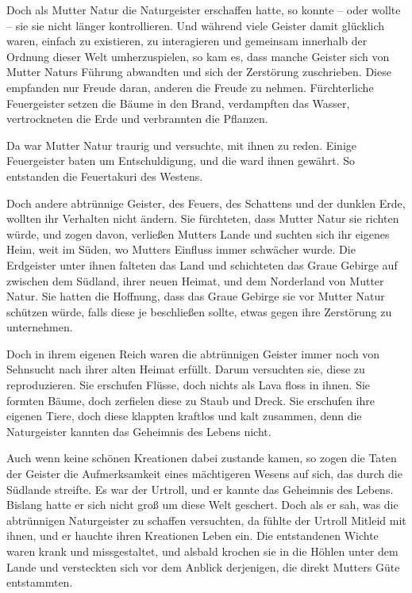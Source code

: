 Doch als Mutter Natur die Naturgeister erschaffen hatte, so konnte – oder wollte – sie sie nicht länger kontrollieren. Und während viele Geister damit glücklich waren, einfach zu existieren, zu interagieren und gemeinsam innerhalb der Ordnung dieser Welt umherzuspielen, so kam es, dass manche Geister sich von Mutter Naturs Führung abwandten und sich der Zerstörung zuschrieben. Diese empfanden nur Freude daran, anderen die Freude zu nehmen. Fürchterliche Feuergeister setzen die Bäume in den Brand, verdampften das Wasser, vertrockneten die Erde und verbrannten die Pflanzen.

Da war Mutter Natur traurig und versuchte, mit ihnen zu reden. Einige Feuergeister baten um Entschuldigung, und die ward ihnen gewährt. So entstanden die Feuertakuri des Westens.

Doch andere abtrünnige Geister, des Feuers, des Schattens und der dunklen Erde, wollten ihr Verhalten nicht ändern. Sie fürchteten, dass Mutter Natur sie richten würde, und zogen davon, verließen Mutters Lande und suchten sich ihr eigenes Heim, weit im Süden, wo Mutters Einfluss immer schwächer wurde. Die Erdgeister unter ihnen falteten das Land und schichteten das Graue Gebirge auf zwischen dem Südland, ihrer neuen Heimat, und dem Norderland von Mutter Natur. Sie hatten die Hoffnung, dass das Graue Gebirge sie vor Mutter Natur schützen würde, falls diese je beschließen sollte, etwas gegen ihre Zerstörung zu unternehmen.

Doch in ihrem eigenen Reich waren die abtrünnigen Geister immer noch von Sehnsucht nach ihrer alten Heimat erfüllt. Darum versuchten sie, diese zu reproduzieren. Sie erschufen Flüsse, doch nichts als Lava floss in ihnen. Sie formten Bäume, doch zerfielen diese zu Staub und Dreck. Sie erschufen ihre eigenen Tiere, doch diese klappten kraftlos und kalt zusammen, denn die Naturgeister kannten das Geheimnis des Lebens nicht.

Auch wenn keine schönen Kreationen dabei zustande kamen, so zogen die Taten der Geister die Aufmerksamkeit eines mächtigeren Wesens auf sich, das durch die Südlande streifte. Es war der Urtroll, und er kannte das Geheimnis des Lebens. Bislang hatte er sich nicht groß um diese Welt geschert. Doch als er sah, was die abtrünnigen Naturgeister zu schaffen versuchten, da fühlte der Urtroll Mitleid mit ihnen, und er hauchte ihren Kreationen Leben ein. Die entstandenen Wichte waren krank und missgestaltet, und alsbald krochen sie in die Höhlen unter dem Lande und versteckten sich vor dem Anblick derjenigen, die direkt Mutters Güte entstammten.

